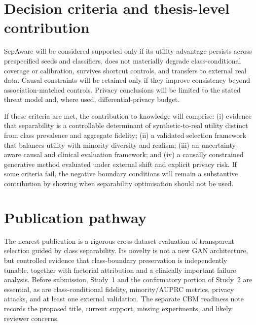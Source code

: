 \section{Decision criteria and thesis-level contribution}

SepAware will be considered supported only if its utility advantage persists across prespecified seeds and classifiers, does not materially degrade class-conditional coverage or calibration, survives shortcut controls, and transfers to external real data. Causal constraints will be retained only if they improve consistency beyond association-matched controls. Privacy conclusions will be limited to the stated threat model and, where used, differential-privacy budget.

If these criteria are met, the contribution to knowledge will comprise: (i) evidence that separability is a controllable determinant of synthetic-to-real utility distinct from class prevalence and aggregate fidelity; (ii) a validated selection framework that balances utility with minority diversity and realism; (iii) an uncertainty-aware causal and clinical evaluation framework; and (iv) a causally constrained generative method evaluated under external shift and explicit privacy risk. If some criteria fail, the negative boundary conditions will remain a substantive contribution by showing when separability optimisation should not be used.

\section{Publication pathway}

The nearest publication is a rigorous cross-dataset evaluation of transparent selection guided by class separability. Its novelty is not a new GAN architecture, but controlled evidence that class-boundary preservation is independently tunable, together with factorial attribution and a clinically important failure analysis. Before submission, Study~1 and the confirmatory portion of Study~2 are essential, as are class-conditional fidelity, minority/AUPRC metrics, privacy attacks, and at least one external validation. The separate CBM readiness note records the proposed title, current support, missing experiments, and likely reviewer concerns.
